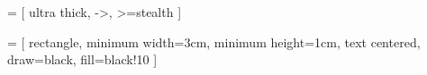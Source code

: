  = [
    ultra thick,
    ->,
    >=stealth
]



 = [
    rectangle,
    minimum width=3cm,
    minimum height=1cm,
    text centered,
    draw=black,
    fill=black!10
]


